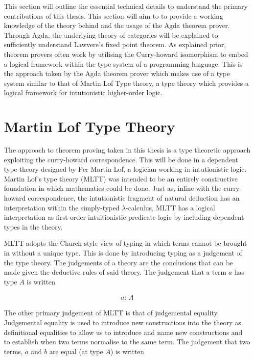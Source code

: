 This section will outline the essential technical details to understand the
primary contributions of this thesis. This section will aim to to provide a
working knowledge of the theory behind and the usage of the Agda theorem prover.
Through Agda, the underlying theory of categories will be explained to
sufficiently understand Lawvere's fixed point theorem. As explained prior,
theorem provers often work by utilising the Curry-howard isomorphism to embed a
logical framework within the type system of a programming language. This is the
approach taken by the Agda theorem prover which makes use of a type system
similar to that of Martin Lof Type theory, a type theory which provides a
logical framework for intutionistic higher-order logic.

\section{Martin Lof Type Theory}
The approach to theorem proving taken in this thesis is a type theoretic
approach exploiting the curry-howard correspondence. This will be done in a
dependent type theory designed by Per Martin Lof, a logician working in
intutionistic logic. Martin Lof's type theory (MLTT) was
intended to be an entirely constructive foundation in which mathematics could be
done. Just as, inline with the curry-howard correspondence, the intutionistic
fragment of natural deduction has an interpretation within the simply-typed
$\lambda$-calculus, MLTT has a logical interpretation as first-order
intuitionistic predicate logic by including dependent types in the theory.

MLTT adopts the Church-style view of typing in which terms cannot be brought in
without a unique type. This is done by introducing typing as a judgement of the
type theory. The judgements of a theory are the conclusions that can be made
given the deductive rules of said theory. The judgement that a
term $a$ has type $A$ is written

\begin{align*}
    a: \, A
\end{align*}

The other primary judgement of MLTT is that of judgemental equality. Judgemental
equality is used to introduce new constructions into the theory as definitional
equalities to allow us to introduce and name new constructions and to establish
when two terms normalise to the same term. The judgement that two terms,
$a$ and $b$ are equal (at type $A$) is written

